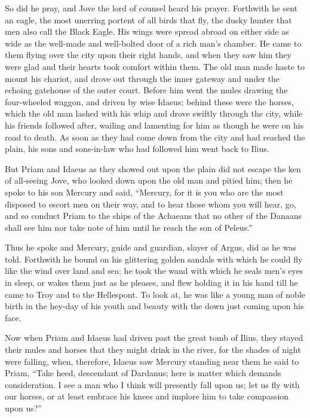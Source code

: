 So did he pray, and Jove the lord of counsel heard his prayer. Forthwith
he sent an eagle, the most unerring portent of all birds that fly, the
dusky hunter that men also call the Black Eagle. His wings were spread
abroad on either side as wide as the well-made and well-bolted door of a
rich man’s chamber. He came to them flying over the city upon their right
hands, and when they saw him they were glad and their hearts took comfort
within them. The old man made haste to mount his chariot, and drove out
through the inner gateway and under the echoing gatehouse of the outer
court. Before him went the mules drawing the four-wheeled waggon, and
driven by wise Idaeus; behind these were the horses, which the old man
lashed with his whip and drove swiftly through the city, while his friends
followed after, wailing and lamenting for him as though he were on his
road to death. As soon as they had come down from the city and had reached
the plain, his sons and sons-in-law who had followed him went back to
Ilius.

But Priam and Idaeus as they showed out upon the plain did not escape the
ken of all-seeing Jove, who looked down upon the old man and pitied him;
then he spoke to his son Mercury and said, “Mercury, for it is you who are
the most disposed to escort men on their way, and to hear those whom you
will hear, go, and so conduct Priam to the ships of the Achaeans that no
other of the Danaans shall see him nor take note of him until he reach the
son of Peleus.”

Thus he spoke and Mercury, guide and guardian, slayer of Argus, did as he
was told. Forthwith he bound on his glittering golden sandals with which
he could fly like the wind over land and sea; he took the wand with which
he seals men’s eyes in sleep, or wakes them just as he pleases, and flew
holding it in his hand till he came to Troy and to the Hellespont. To look
at, he was like a young man of noble birth in the hey-day of his youth and
beauty with the down just coming upon his face.

Now when Priam and Idaeus had driven past the great tomb of Ilius, they
stayed their mules and horses that they might drink in the river, for the
shades of night were falling, when, therefore, Idaeus saw Mercury standing
near them he said to Priam, “Take heed, descendant of Dardanus; here is
matter which demands consideration. I see a man who I think will presently
fall upon us; let us fly with our horses, or at least embrace his knees
and implore him to take compassion upon us?”

